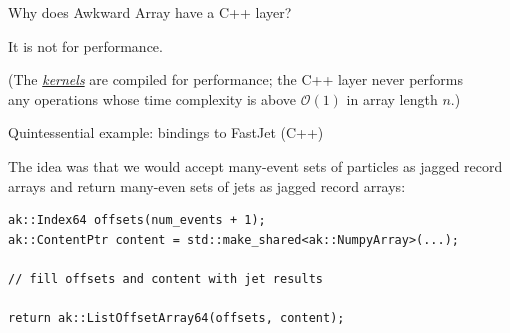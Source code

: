 \documentclass[aspectratio=169]{beamer}
\begin{document}
\begin{frame}{Why does Awkward Array have a C++ layer?}
\LARGE
\vspace{0.5 cm}

\begin{center}
It is not for performance.
\end{center}

\large
\begin{center}
(The \underline{\it kernels} are compiled for performance; the C++ layer never performs \\ any operations whose time complexity is above $\mathcal{O}(1)$ in array length $n$.)
\end{center}

\LARGE
\vspace{1 cm}
\begin{center}
\end{center}
\end{frame}

\begin{frame}[fragile]{Quintessential example: bindings to FastJet (C++)}
\large
\vspace{0.5 cm}

The idea was that we would accept many-event sets of particles as jagged record arrays and return many-even sets of jets as jagged record arrays:

\vspace{0.25 cm}
\begin{center}
\begin{minipage}{0.95\linewidth}
\small
\begin{verbatim}
ak::Index64 offsets(num_events + 1);
ak::ContentPtr content = std::make_shared<ak::NumpyArray>(...);

// fill offsets and content with jet results

return ak::ListOffsetArray64(offsets, content);
\end{verbatim}
\end{minipage}
\end{center}

\vspace{0.25 cm}

\vspace{0.5 cm}
\end{frame}
\end{document}
